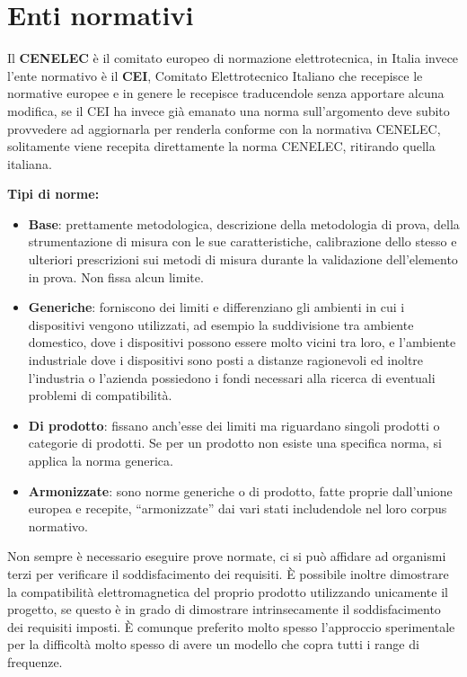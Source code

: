 \section{Enti normativi}
Il \textbf{CENELEC} è il comitato europeo di normazione elettrotecnica, in Italia invece l'ente normativo
è il \textbf{CEI}, Comitato Elettrotecnico Italiano che recepisce le normative europee e in genere le recepisce
traducendole senza apportare alcuna modifica, se il CEI ha invece già emanato una norma sull'argomento deve 
subito provvedere ad aggiornarla per renderla conforme con la normativa CENELEC, solitamente viene recepita
direttamente la norma CENELEC, ritirando quella italiana.

\textbf{Tipi di norme:}
\begin{itemize}
 \item \textbf{Base}: prettamente metodologica, descrizione della metodologia di prova, della strumentazione di misura
 con le sue caratteristiche, calibrazione dello stesso e ulteriori prescrizioni sui metodi di misura
 durante la validazione dell'elemento in prova. Non fissa alcun limite.
 \item \textbf{Generiche}: forniscono dei limiti e differenziano gli ambienti in cui i dispositivi vengono 
 utilizzati, ad esempio la suddivisione tra ambiente domestico, dove i dispositivi possono essere molto vicini
 tra loro, e l'ambiente industriale dove i dispositivi sono posti a distanze ragionevoli ed inoltre l'industria
 o l'azienda possiedono i fondi necessari alla ricerca di eventuali problemi di compatibilità.
 \item \textbf{Di prodotto}: fissano anch'esse dei limiti ma riguardano singoli prodotti o categorie di prodotti.
 Se per un prodotto non esiste una specifica norma, si applica la norma generica.
 \item \textbf{Armonizzate}: sono norme generiche o di prodotto, fatte proprie dall'unione europea e recepite,
 ``armonizzate'' dai vari stati includendole nel loro corpus normativo.
 \end{itemize}

Non sempre è necessario eseguire prove normate, ci si può affidare ad organismi terzi per verificare
il soddisfacimento dei requisiti. È possibile inoltre dimostrare la compatibilità elettromagnetica del proprio
prodotto utilizzando unicamente il progetto, se questo è in grado di dimostrare intrinsecamente il 
soddisfacimento dei requisiti imposti. È comunque preferito molto spesso l'approccio sperimentale per
la difficoltà molto spesso di avere un modello che copra tutti i range di frequenze.

